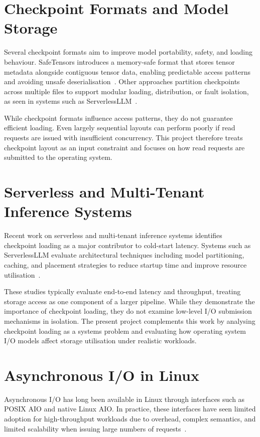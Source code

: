 \documentclass[]{final_report}
\begin{document}
\section{Checkpoint Formats and Model Storage}

Several checkpoint formats aim to improve model portability, safety, and loading behaviour. SafeTensors introduces a memory-safe format that stores tensor metadata alongside contiguous tensor data, enabling predictable access patterns and avoiding unsafe deserialisation~\cite{safetensors_docs}. Other approaches partition checkpoints across multiple files to support modular loading, distribution, or fault isolation, as seen in systems such as ServerlessLLM~\cite{FU:2024,serverlessllm_repo}.

While checkpoint formats influence access patterns, they do not guarantee efficient loading. Even largely sequential layouts can perform poorly if read requests are issued with insufficient concurrency. This project therefore treats checkpoint layout as an input constraint and focuses on how read requests are submitted to the operating system.

\section{Serverless and Multi-Tenant Inference Systems}

Recent work on serverless and multi-tenant inference systems identifies checkpoint loading as a major contributor to cold-start latency. Systems such as ServerlessLLM evaluate architectural techniques including model partitioning, caching, and placement strategies to reduce startup time and improve resource utilisation~\cite{FU:2024}.

These studies typically evaluate end-to-end latency and throughput, treating storage access as one component of a larger pipeline. While they demonstrate the importance of checkpoint loading, they do not examine low-level I/O submission mechanisms in isolation. The present project complements this work by analysing checkpoint loading as a systems problem and evaluating how operating system I/O models affect storage utilisation under realistic workloads.

\section{Asynchronous I/O in Linux}

Asynchronous I/O has long been available in Linux through interfaces such as POSIX AIO and native Linux AIO. In practice, these interfaces have seen limited adoption for high-throughput workloads due to overhead, complex semantics, and limited scalability when issuing large numbers of requests~\cite{MAN7_AIO7,MAN7_IO_SETUP2,MAN7_IO_SUBMIT2}.
\end{document}
